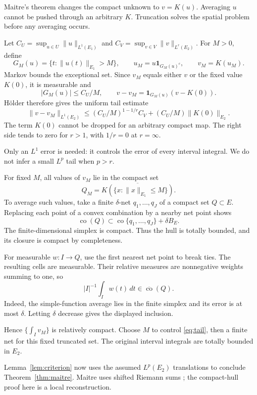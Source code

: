 \documentclass[12pt,reqno]{amsart}
\begin{document}
Maitre's theorem \cite[Theorem 2.1, p.~1726]{S-maitre} changes the compact unknown to $v=K(u)$. Averaging $u$ cannot be pushed through an arbitrary $K$. Truncation solves the spatial problem before any averaging occurs.

Let $C_U=\sup_{u\in U}\|u\|_{L^1(E_1)}$ and $C_V=\sup_{v\in V}\|v\|_{L^r(E_2)}$. For $M>0$, define
\[
G_M(u)=\{t:\|u(t)\|_{E_1}>M\},\qquad
u_M=u\mathbf1_{G_M(u)^c},\qquad v_M=K(u_M).
\]
Markov bounds the exceptional set. Since $v_M$ equals either $v$ or the fixed value $K(0)$, it is measurable and
\[
|G_M(u)|\le C_U/M,\qquad v-v_M=\mathbf1_{G_M(u)}(v-K(0)).
\]
H\"older therefore gives the uniform tail estimate
\begin{equation}\label{eq:tail}
\|v-v_M\|_{L^1(E_2)}
\le (C_U/M)^{1-1/r}C_V+(C_U/M)\|K(0)\|_{E_2}.
\end{equation}
The term $K(0)$ cannot be dropped for an arbitrary compact map. The right side tends to zero for $r>1$, with $1/r=0$ at $r=\infty$.

Only an $L^1$ error is needed: it controls the error of every interval integral. We do not infer a small $L^p$ tail when $p>r$.

For fixed $M$, all values of $v_M$ lie in the compact set
\[
Q_M=\overline{K(\{x:\|x\|_{E_1}\le M\})}.
\]
To average such values, take a finite $\delta$-net $q_1,\ldots,q_J$ of a compact set $Q\subset E$. Replacing each point of a convex combination by a nearby net point shows
\[
\operatorname{co}(Q)\subset
\operatorname{co}\{q_1,\ldots,q_J\}+\delta B_E.
\]
The finite-dimensional simplex is compact. Thus the hull is totally bounded, and its closure is compact by completeness.

For measurable $w:I\to Q$, use the first nearest net point to break ties. The resulting cells are measurable. Their relative measures are nonnegative weights summing to one, so
\[
|I|^{-1}\int_Iw(t)\,dt\in\overline{\operatorname{co}}(Q).
\]
Indeed, the simple-function average lies in the finite simplex and its error is at most $\delta$. Letting $\delta$ decrease gives the displayed inclusion.

Hence $\{\int_Iv_M\}$ is relatively compact. Choose $M$ to control \eqref{eq:tail}, then a finite net for this fixed truncated set. The original interval integrals are totally bounded in $E_2$.

Lemma~\ref{lem:criterion} now uses the assumed $L^p(E_2)$ translations to conclude Theorem~\ref{thm:maitre}. Maitre uses shifted Riemann sums \cite[Lemma 2.3, pp.~1726--1730]{S-maitre}; the compact-hull proof here is a local reconstruction.
\end{document}
